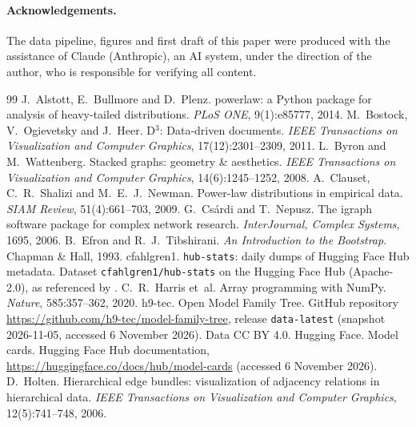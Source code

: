 \documentclass[11pt]{article}
\begin{document}
\paragraph{Acknowledgements.} The data pipeline, figures and first draft of this paper were produced with the assistance of Claude (Anthropic), an AI system, under the direction of the author, who is responsible for verifying all content.

\small
\begin{thebibliography}{99}\setlength{\itemsep}{1pt}
 J.~Alstott, E.~Bullmore and D.~Plenz. powerlaw: a Python package for analysis of heavy-tailed distributions. \emph{PLoS ONE}, 9(1):e85777, 2014.
 M.~Bostock, V.~Ogievetsky and J.~Heer. D$^3$: Data-driven documents. \emph{IEEE Transactions on Visualization and Computer Graphics}, 17(12):2301--2309, 2011.
 L.~Byron and M.~Wattenberg. Stacked graphs: geometry \& aesthetics. \emph{IEEE Transactions on Visualization and Computer Graphics}, 14(6):1245--1252, 2008.
 A.~Clauset, C.~R.~Shalizi and M.~E.~J.~Newman. Power-law distributions in empirical data. \emph{SIAM Review}, 51(4):661--703, 2009.
 G.~Cs\'ardi and T.~Nepusz. The igraph software package for complex network research. \emph{InterJournal, Complex Systems}, 1695, 2006.
 B.~Efron and R.~J.~Tibshirani. \emph{An Introduction to the Bootstrap}. Chapman \& Hall, 1993.
 cfahlgren1. \texttt{hub-stats}: daily dumps of Hugging Face Hub metadata. Dataset \texttt{cfahlgren1/hub-stats} on the Hugging Face Hub (Apache-2.0), as referenced by \citep{h9tec2026}.
 C.~R.~Harris et~al. Array programming with NumPy. \emph{Nature}, 585:357--362, 2020.
 h9-tec. Open Model Family Tree. GitHub repository \url{https://github.com/h9-tec/model-family-tree}, release \texttt{data-latest} (snapshot 2026-11-05, accessed 6 November 2026). Data CC BY 4.0.
 Hugging Face. Model cards. Hugging Face Hub documentation, \url{https://huggingface.co/docs/hub/model-cards} (accessed 6 November 2026).
 D.~Holten. Hierarchical edge bundles: visualization of adjacency relations in hierarchical data. \emph{IEEE Transactions on Visualization and Computer Graphics}, 12(5):741--748, 2006.

\end{thebibliography}
\end{document}
